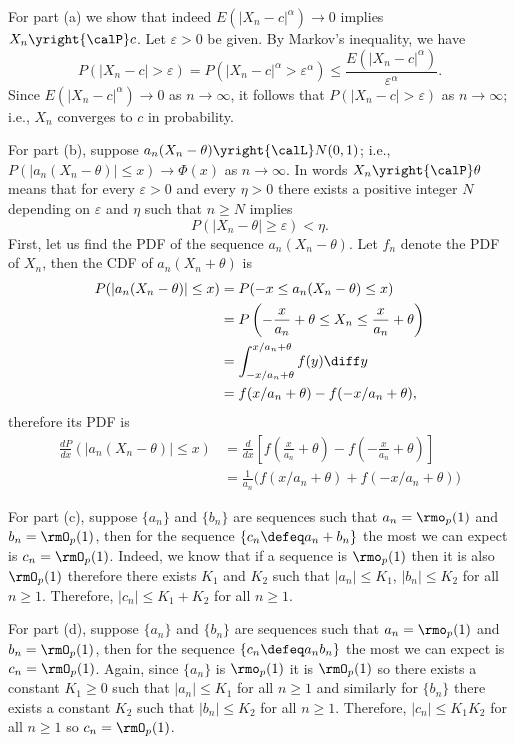 \begin{solution}
  For part (a) we show that indeed \(E(|X_n-c|^\alpha)\to 0\) implies
  \(X_n\yright{\calP}c\). Let \(\varepsilon>0\) be given. By Markov's
  inequality, we have
  \[
    P(|X_n-c|>\varepsilon)=
    P(|X_n-c|^\alpha>\varepsilon^\alpha)
    \leq\frac{E(|X_n-c|^\alpha)}{\varepsilon^\alpha}.
  \]
  Since \(E(|X_n-c|^\alpha)\to 0\) as \(n\to\infty\), it follows that
  \(P(|X_n-c|>\varepsilon)\) as \(n\to\infty\); i.e., \(X_n\) converges to
  \(c\) in probability.

  For part (b), suppose \(a_n(X_n-\theta)\yright{\calL}N(0,1)\); i.e.,
  \(P(|a_n(X_n-\theta)|\leq x)\to\Phi(x)\) as \(n\to\infty\). In words
  \(X_n\yright{\calP}\theta\) means that for every \(\varepsilon>0\) and
  every \(\eta>0\) there exists a positive integer \(N\) depending on
  \(\varepsilon\) and \(\eta\) such that \(n\geq N\) implies
  \[
    P(|X_n-\theta|\geq\varepsilon)<\eta.
  \]
  First, let us find the PDF of the sequence \(a_n(X_n-\theta)\). Let \(f_n\)
  denote the PDF of \(X_n\), then the CDF of \(a_n(X_n+\theta)\) is
  \begin{align*}
    P(|a_n(X_n-\theta)|\leq x)
    &=P(-x\leq a_n(X_n-\theta)\leq x)\\
    &=P\left(-\frac{x}{a_n}+\theta\leq X_n\leq\frac{x}{a_n}+\theta\right)\\
    &=\int_{-x/a_n+\theta}^{x/a_n+\theta} f(y)\diff y\\
    &=f(x/a_n+\theta)
      -f(-x/a_n+\theta),
  \end{align*}
  therefore its PDF is
  \begin{align*}
    \frac{dP}{dx}(|a_n(X_n-\theta)|\leq x)
    &=\frac{d}{dx}
      \left[%
      f\left(\frac{x}{a_n}+\theta\right)%
      -f\left(-\frac{x}{a_n}+\theta\right)%
      \right]\\
    &=\frac{1}{a_n}\bigl(f(x/a_n+\theta)+f(-x/a_n+\theta)\bigr)
  \end{align*}


  For part (c), suppose \(\{a_n\}\) and \(\{b_n\}\) are sequences such that
  \(a_n=\rmo_p(1)\) and \(b_n=\rmO_p(1)\), then for the sequence
  \(\{c_n\defeq a_n+b_n\}\) the most we can expect is
  \(c_n=\rmO_p(1)\). Indeed, we know that if a sequence is \(\rmo_p(1)\)
  then it is also \(\rmO_p(1)\) therefore there exists \(K_1\) and \(K_2\)
  such that \(|a_n|\leq K_1\), \(|b_n|\leq K_2\) for all \(n\geq
  1\). Therefore, \(|c_n|\leq K_1+K_2\) for all \(n\geq 1\).

  For part (d), suppose \(\{a_n\}\) and \(\{b_n\}\) are sequences such that
  \(a_n=\rmo_p(1)\) and \(b_n=\rmO_p(1)\), then for the sequence
  \(\{c_n\defeq a_nb_n\}\) the most we can expect is
  \(c_n=\rmO_p(1)\). Again, since \(\{a_n\}\) is \(\rmo_p(1)\) it is
  \(\rmO_p(1)\) so there exists a constant \(K_1\geq 0\) such that
  \(|a_n|\leq K_1\) for all \(n\geq 1\) and similarly for \(\{b_n\}\) there
  exists a constant \(K_2\) such that \(|b_n|\leq K_2\) for all
  \(n\geq 1\). Therefore, \(|c_n|\leq K_1K_2\) for all \(n\geq 1\) so
  \(c_n=\rmO_p(1)\).


\end{solution}
